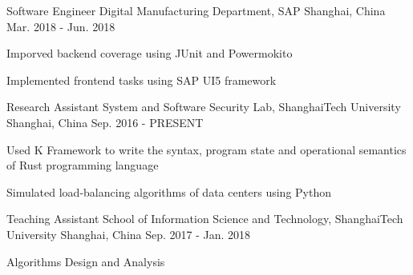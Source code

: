 


\begin{cventries}


\cventry
{Software Engineer} %
{Digital Manufacturing Department, SAP} %
{Shanghai, China} %
{Mar. 2018 - Jun. 2018} %
{ %
\begin{cvitems}
\item {Imporved backend coverage using JUnit and Powermokito}
\item {Implemented frontend tasks using SAP UI5 framework}
\end{cvitems}
}


\cventry
{Research Assistant} %
{System and Software Security Lab, ShanghaiTech University} %
{Shanghai, China} %
{Sep. 2016 - PRESENT} %
{ %
\begin{cvitems}
\item {Used K Framework to write the syntax, program state and operational semantics of Rust programming language}
\item {Simulated load-balancing algorithms of data centers using Python}
\end{cvitems}
}


\cventry
{Teaching Assistant} %
{School of Information Science and Technology, ShanghaiTech University} %
{Shanghai, China} %
{Sep. 2017 - Jan. 2018} %
{ %
\begin{cvitems}
\item {Algorithms Design and Analysis}
\end{cvitems} 
}


\end{cventries}
